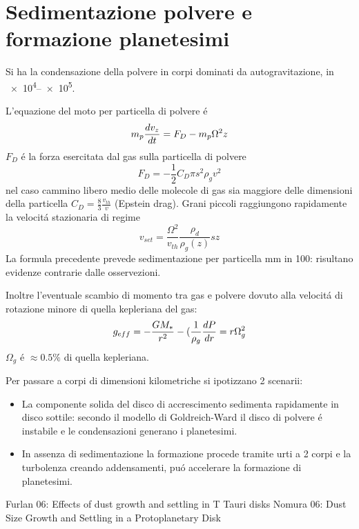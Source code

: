 \section{Sedimentazione polvere e formazione planetesimi}

Si ha la condensazione della polvere in corpi dominati da autogravitazione, in \SIrange{e4}{e5}{\year}.

L'equazione del moto per particella di polvere \'e
\begin{equation}
m_p\TDy{t}{v_z}=F_D-m_p\Omega^2z
\end{equation}
$F_D$ \'e la forza esercitata dal gas sulla particella di polvere
\begin{equation}
F_D=-\frac{1}{2}C_D\pi s^2\rho_gv^2
\end{equation}
nel caso cammino libero medio delle molecole di gas sia maggiore delle dimensioni della particella $C_D=\frac{8}{3}\frac{v_{th}}{v}$ (Epstein drag).
Grani piccoli raggiungono rapidamente la velocit\'a stazionaria di regime
\begin{equation}
v_{set}=\frac{\Omega^2}{v_{th}}\frac{\rho_d}{\rho_g(z)}sz
\end{equation}
La formula precedente prevede sedimentazione per particella mm in 100: risultano evidenze contrarie dalle osservezioni.

Inoltre l'eventuale scambio di momento tra gas e polvere dovuto alla velocit\'a di rotazione minore di quella kepleriana del gas:
\begin{equation}
g_{eff}=-\frac{GM_*}{r^2}-(\frac{1}{\rho_g}\TDy{r}{P}=r\Omega_g^2
\end{equation}
$\Omega_g$ \'e $\approx0.5\%$ di quella kepleriana.

Per passare a corpi di dimensioni kilometriche si ipotizzano 2 scenarii:
\begin{itemize}
\item La componente solida del disco di accrescimento sedimenta rapidamente in disco sottile: secondo il modello di Goldreich-Ward il disco di polvere \'e instabile e le condensazioni generano i planetesimi.
\item In assenza di sedimentazione la formazione procede tramite urti a 2 corpi e la turbolenza creando addensamenti, pu\'o accelerare la formazione di planetesimi.
\end{itemize}

\begin{workout}
Furlan 06: Effects of dust growth and settling in T Tauri disks
Nomura 06: Dust Size Growth and Settling in a Protoplanetary Disk
\cite{lissauer1993planet}
 \end{workout}

